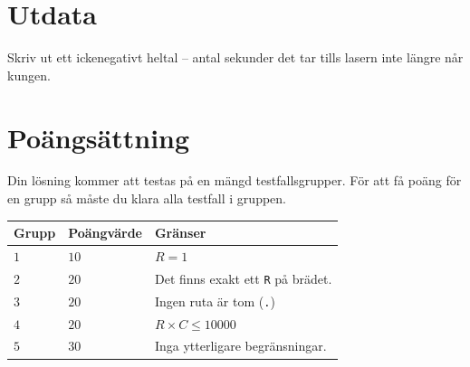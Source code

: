 \section*{Utdata}
Skriv ut ett ickenegativt heltal -- antal sekunder det tar tills lasern inte längre når kungen.

\section*{Poängsättning}
Din lösning kommer att testas på en mängd testfallsgrupper.
För att få poäng för en grupp så måste du klara alla testfall i gruppen.

\noindent
\begin{tabular}{| l | l | l |}
\hline
Grupp & Poängvärde & Gränser \\ \hline
$1$    & $10$       &  $R=1$ \\ \hline
$2$    & $20$       &  Det finns exakt ett \texttt{R} på brädet. \\ \hline
$3$    & $20$       &  Ingen ruta är tom (\texttt{.}) \\ \hline
$4$    & $20$       &  $R\times C \leq 10000$ \\ \hline
$5$    & $30$       &  Inga ytterligare begränsningar. \\ \hline
\end{tabular}

